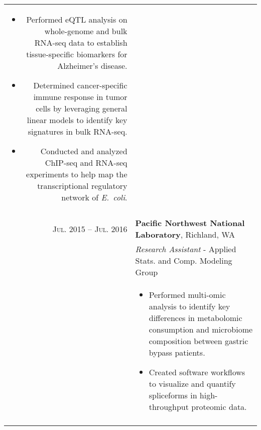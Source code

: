 \documentclass[a4paper,10pt]{report}
\begin{document}
\begin{longtable}{r|p{10.5cm}}
{\begin{itemize}
			\item Performed eQTL analysis on whole-genome and bulk RNA-seq data to establish tissue-specific biomarkers for Alzheimer's disease.
			\item Determined cancer-specific immune response in
			      tumor cells by leveraging general linear models to identify key signatures in bulk RNA-seq.
			\item Conducted and analyzed ChIP-seq and RNA-seq experiments to help map the transcriptional
			      regulatory network of \emph{E.\ coli}.
		\end{itemize}
	} \vspace{-3.5mm}                                                                                                \\
	\multicolumn{2}{c}{}
	\\[-0.75em]
	\textsc{Jul. 2015 -- Jul. 2016} & \textbf{Pacific Northwest National Laboratory}, Richland, WA                   \\
	                                & \small \emph{Research Assistant} - Applied Stats. and Comp. Modeling Group     \\
	                                & \footnotesize{
		\vspace{-3.5mm}
		\begin{itemize}
			\setlength\itemsep{0em}
			\item Performed multi-omic analysis to identify key differences in metabolomic consumption and microbiome composition between gastric bypass patients.
			\item Created software workflows to visualize and quantify spliceforms in high-throughput proteomic data.
		\end{itemize}
	} \vspace{-3.5mm}                                                                                                \\
	\multicolumn{2}{c}{}                                                                                             \\[-0.75em]
\end{longtable}


\end{document}
